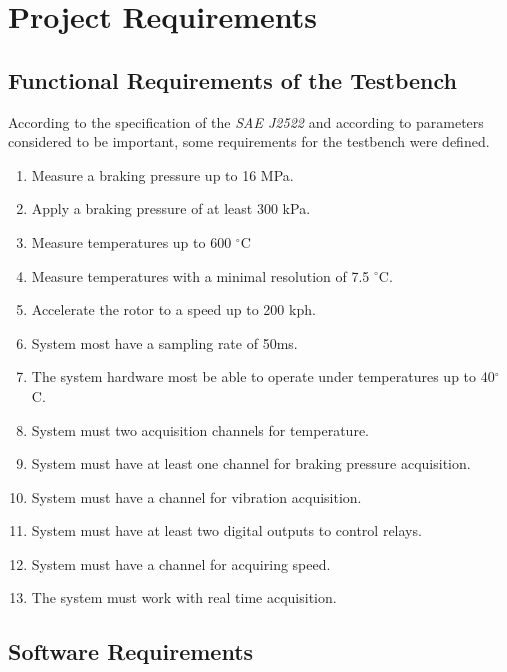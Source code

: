 \chapter{Project Requirements}

	\section{Functional Requirements of the Testbench}

		According to the specification of the \textit{SAE J2522} and according to parameters considered to be important, some requirements for the testbench were defined.

		\begin{enumerate}
			\item Measure a braking pressure up to 16 MPa.
			\item Apply a braking pressure of at least 300 kPa.
			\item Measure temperatures up to 600 $^{\circ}$C
			\item Measure temperatures with a minimal resolution of 7.5 $^{\circ}$C.
			\item Accelerate the rotor to a speed up to 200 kph.
			\item System most have a sampling rate of 50ms.
			\item The system hardware most be able to operate under temperatures up to 40$^{\circ}$C.
			\item System must two acquisition channels for temperature.
			\item System must have at least one channel for braking pressure acquisition.
			\item System must have a channel for vibration acquisition.
			\item System must have at least two digital outputs to control relays.
			\item System must have a channel for acquiring speed.
			\item The system must work with real time acquisition.
		\end{enumerate}
		
	\section{Software Requirements}
		
